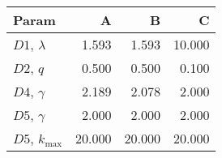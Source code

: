 \begin{tabular}{lrrr}
\toprule
 Param            &      A &      B &      C \\
\midrule
 $D1$, $\lambda$  &  \num{1.593} &  \num{1.593} & \num{10.000} \\
 $D2$, $q$        &  \num{0.500} &  \num{0.500} &  \num{0.100} \\
 $D4$, $\gamma$   &  \num{2.189} &  \num{2.078} &  \num{2.000} \\
 $D5$, $\gamma$   &  \num{2.000} &  \num{2.000} &  \num{2.000} \\
 $D5$, $k_{\max}$ & \num{20.000} & \num{20.000} & \num{20.000} \\
\bottomrule
\end{tabular}